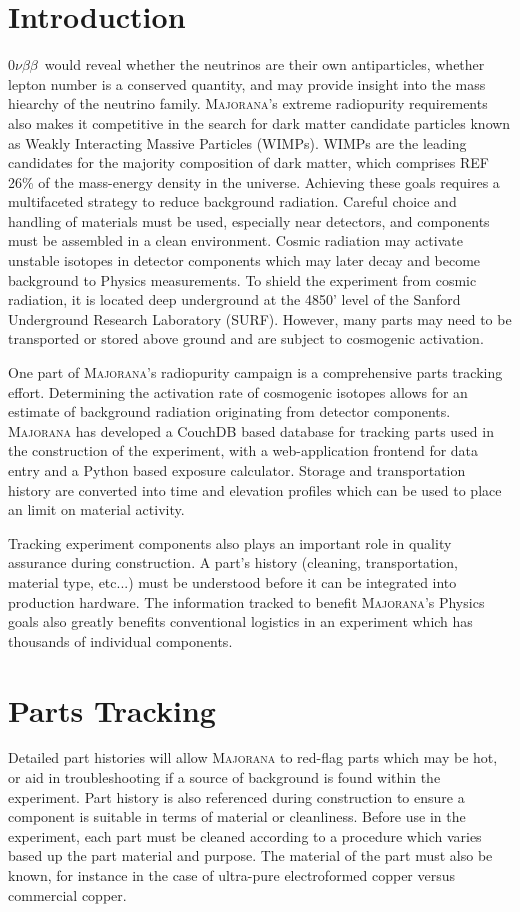 \documentclass[journal]{IEEEtran}
\def\znbb{0$\nu\beta\beta$}
\begin{document}
\section{Introduction}
 \znbb\ would reveal whether the neutrinos are their own antiparticles,
whether lepton number is a conserved quantity, and may provide insight into
the mass hiearchy of the neutrino family.
\textsc{Majorana}'s extreme radiopurity requirements also makes it competitive in the search for dark
matter candidate particles known as Weakly Interacting Massive Particles (WIMPs).
WIMPs are the leading candidates for the majority composition of dark matter,
which comprises REF 26\% of the mass-energy density in the universe.
Achieving these goals requires a multifaceted strategy to reduce background radiation.
Careful choice and handling of materials must be used,
especially near detectors, and components must be assembled in a clean environment.
Cosmic radiation may activate unstable isotopes in detector components which may later decay and become background
to Physics measurements.
To shield the experiment from cosmic radiation, it is located deep underground
at the 4850' level of the Sanford Underground Research Laboratory (SURF).
However, many parts may need to be transported or stored above ground and are subject to
cosmogenic activation.

One part of \textsc{Majorana}'s radiopurity campaign is a comprehensive parts tracking effort.
Determining the activation rate of cosmogenic isotopes allows for an estimate of background
radiation originating from detector components. \textsc{Majorana} has developed a CouchDB based database
for tracking parts used in the construction of the experiment, with a web-application frontend
for data entry and a Python based exposure calculator. Storage and transportation history are
converted into time and elevation profiles which can be used to place an limit
on material activity.

Tracking experiment components also plays an important role in quality assurance during 
construction. A part's history (cleaning, transportation, material type, etc...) must be 
understood before it can be integrated into production hardware. The information tracked
to benefit \textsc{Majorana}'s Physics goals also greatly benefits conventional logistics in an
experiment which has thousands of individual components.

\section{Parts Tracking}
Detailed part histories will allow \textsc{Majorana}
to red-flag parts which may be hot, or aid in troubleshooting if a source of background
is found within the experiment.
Part history is also referenced during construction to ensure a component is suitable in terms of material or cleanliness.
Before use in the experiment, each part must be cleaned according to a procedure which varies based up the part material and
purpose. The material of the part must also be known, for instance in the case of ultra-pure electroformed copper versus commercial
copper. 
\end{document}

